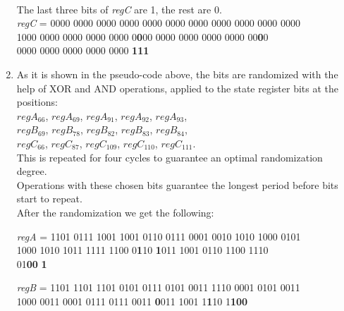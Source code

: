 \begin{enumerate}
	\\
	The last three bits of \emph{regC} are 1, the rest are 0.
	\vspace{0.5em}
	\\
	{\selectfont
		\emph{regC} = 0000 0000 0000 0000 0000 0000 0000 0000 0000 0000 0000 \\ 
		\indent\hspace{1.6cm}1000 0000 0000 0000 0000 0\textbf{0}00 0000 0000 0000 0000 00\textbf{0}0 \\ 
		\indent\hspace{1.6cm}0000 0000 0000 0000 0000 \textbf{111}
	}
	\item As it is shown in the pseudo-code above, the bits are randomized with the help of XOR and AND operations, applied to the state register bits at the positions: 
	\vspace{0.5em}
	\\
	$regA_{66}$, $regA_{69}$, $regA_{91}$, $regA_{92}$, $regA_{93}$, \\
	$regB_{69}$, $regB_{78}$, $regB_{82}$, $regB_{83}$, $regB_{84}$, \\
	$regC_{66}$, $regC_{87}$, $regC_{109}$, $regC_{110}$, $regC_{111}$.
	\vspace{0.5em}
	\\
	This is repeated for four cycles to guarantee an optimal randomization degree.\\
	Operations with these chosen bits guarantee the longest period before bits start to repeat.\\
	After the randomization we get the following:
	
	{\selectfont
		
		\emph{regA} = 1101 0111 1001 1001 0110 0111 0001 0010 1010 1000 0101 \\ 
		\indent\hspace{1.6cm}1000 1010 1011 1111 1100 0\textbf{1}10 \textbf{1}011 1001 0110 1100 1110 \\ 
		\indent\hspace{1.6cm}01\textbf{00} \textbf{1}
		
		\emph{regB} = 1101 1101 1101 0101 0111 0101 0011 1110 0001 0101 0011 \\ 
		\indent\hspace{1.6cm}1000 0011 0001 0111 0111 0011 \textbf{0}011 1001 1\textbf{1}10 1\textbf{100}
		
}
\end{enumerate}
